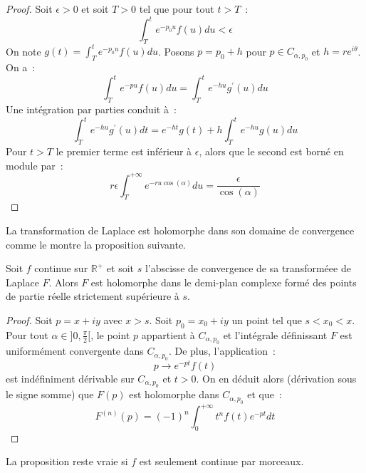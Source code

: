 \begin{proof}
Soit $\epsilon > 0$ et soit $T > 0$ tel que pour tout $t > T$~:
\[
\int_T^t e^{-p_0 u}f(u) du < \epsilon
\]
On note $g(t) = \int_T^t e^{-p_0 u}f(u) du$.
Posons $p = p_0 + h$ pour $p \in C_{\alpha, p_0}$ et $h = r e^{i
\theta}$. On a~:
\[
\int_T^t e^{-p u}f(u) du = \int_T^t e^{-hu}g^\prime(u) du
\]
Une intégration par parties conduit à~:
\[
\int_T^t e^{-hu}g^\prime(u) dt = e^{-ht}g(t) + h \int_T^t e^{-hu}g(u) du
\]
Pour $t > T$ le premier terme est inférieur à $\epsilon$, alors que le
second est borné en module par~:
\[
r \epsilon \int_T^{+\infty} e^{-r u \cos(\alpha)} d u =
\frac{\epsilon}{\cos(\alpha)} 
\]
\end{proof}
La transformation de Laplace est holomorphe dans son domaine de
convergence comme le montre la proposition suivante.
\begin{mandatory}
\begin{prop}
Soit $f$ continue sur $\mathbb{R}^+$ et soit $s$ l'abscisse de
convergence de sa transforméee de Laplace $F$. Alors $F$ est
holomorphe dans le demi-plan complexe formé des points de partie
réelle strictement supérieure à $s$.
\end{prop}
\end{mandatory}
\begin{proof}
Soit $p = x+iy$ avec $x > s$. Soit $p_0 = x_0 + i y$ un point tel
que $s < x_0 < x$. Pour tout $\alpha \in ]0, \frac{\pi}{2}[$, le point
$p$ appartient à $C_{\alpha, p_0}$ et l'intégrale définissant $F$
est uniformément convergente dans $C_{\alpha, p_0}$. De plus,
l'application~:
\[
p \to e^{-pt} f(t)
\]
est indéfiniment dérivable sur $C_{\alpha, p_0}$ et $t > 0$. On en
déduit alors (dérivation sous le signe somme) que $F(p)$ est
holomorphe dans $C_{\alpha, p_0}$ et que~:
\[
F^{(n)}(p) = (-1)^n \int_0^{+\infty} t^n f(t) e^{-pt} dt
\] 
\end{proof}
\begin{rem}
La proposition reste vraie si $f$ est seulement continue par morceaux.
\end{rem}
